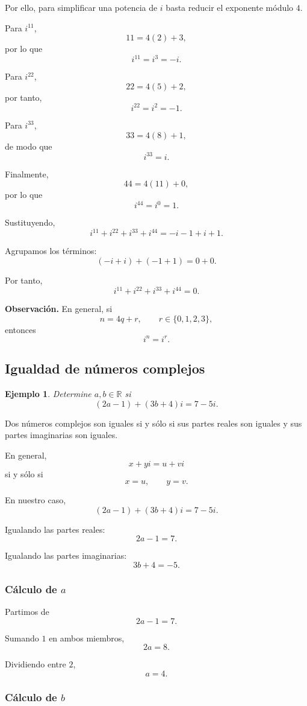 \documentclass[12pt]{article}
\newtheorem{Ejem}{Ejemplo}
\begin{document}
Por ello, para simplificar una potencia de $i$ basta reducir el
exponente módulo $4$.

Para $i^{11}$,
\[
11=4(2)+3,
\]
por lo que
\[
i^{11}=i^3=-i.
\]

Para $i^{22}$,
\[
22=4(5)+2,
\]
por tanto,
\[
i^{22}=i^2=-1.
\]

Para $i^{33}$,
\[
33=4(8)+1,
\]
de modo que
\[
i^{33}=i.
\]

Finalmente,
\[
44=4(11)+0,
\]
por lo que
\[
i^{44}=i^0=1.
\]

Sustituyendo,
\[
i^{11}+i^{22}+i^{33}+i^{44}
=
-i-1+i+1.
\]

Agrupamos los términos:
\[
(-i+i)+(-1+1)=0+0.
\]

Por tanto,
\[
\boxed{
i^{11}+i^{22}+i^{33}+i^{44}=0
}.
\]

\medskip

\noindent
\textbf{Observación.}
En general, si
\[
n=4q+r,
\qquad
r\in\{0,1,2,3\},
\]
entonces
\[
i^n=i^r.
\]

\subsection{Igualdad de números complejos}

\begin{Ejem}
Determine $a,b\in\mathbb{R}$ si
\[
(2a-1)+(3b+4)i=7-5i.
\]
\end{Ejem}

Dos números complejos son iguales si y sólo si sus partes reales
son iguales y sus partes imaginarias son iguales.

En general,
\[
x+yi=u+vi
\]
si y sólo si
\[
x=u,
\qquad
y=v.
\]

En nuestro caso,
\[
(2a-1)+(3b+4)i=7-5i.
\]

Igualando las partes reales:
\[
2a-1=7.
\]

Igualando las partes imaginarias:
\[
3b+4=-5.
\]

\subsubsection*{Cálculo de $a$}

Partimos de
\[
2a-1=7.
\]

Sumando $1$ en ambos miembros,
\[
2a=8.
\]

Dividiendo entre $2$,
\[
\boxed{a=4}.
\]

\subsubsection*{Cálculo de $b$}
\end{document}
